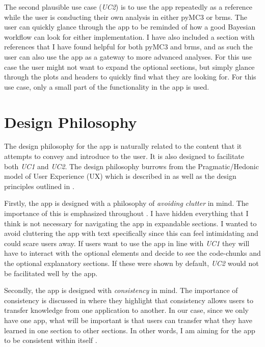 \documentclass[12pt]{article}
\begin{document}
\vspace{5mm}

The second plausible use case (\emph{UC2}) is to use the app repeatedly as a reference
while the user is conducting their own analysis in either pyMC3 or brms. The user can quickly glance through the
app to be reminded of how a good Bayesian workflow can look for either implementation.
I have also included a section with references that I have found helpful for both pyMC3 and brms,
and as such the user can also use the app as a gateway to more advanced analyses.
For this use case the user might not want to expand the optional sections,
but simply glance through the plots and headers to quickly find what they are looking for.
For this use case, only a small part of the functionality in the app is used.

\section{Design Philosophy}
The design philosophy for the app is naturally related to the content that it attempts to convey and
introduce to the user. It is also designed to facilitate both \emph{UC1} and
\emph{UC2}. The design philosophy burrows from the Pragmatic/Hedonic model of
User Experience (UX) which is described in \textcite{hassenzahl2010experience} as well as the design
principles outlined in \textcite{mills1992macintosh}.

\vspace{5mm}

Firstly, the app is designed with a philosophy of \emph{avoiding clutter} in mind.
The importance of this is emphasized throughout \textcite{mills1992macintosh}.
I have hidden everything that I think is not necessary for navigating the app
in expandable sections. I wanted to avoid cluttering the
app with text specifically since this can feel intimidating and could scare users away.
If users want to use the app in line with \emph{UC1} they will have to interact with the optional
elements and decide to see the code-chunks and the optional explanatory sections.
If these were shown by default, \emph{UC2} would not be facilitated well by the app.

\vspace{5mm}

Secondly, the app is designed with \emph{consistency} in mind.
The importance of consistency is discussed in
\textcite[7]{mills1992macintosh}
where they highlight that consistency allows users to transfer knowledge from one
application to another. In our case, since we only have one app, what will be important is
that users can transfer what they have learned in one section to other sections.
In other words, I am aiming for the app to be consistent within itself
\autocite[8]{mills1992macintosh}.
\end{document}
